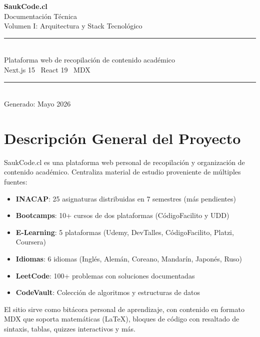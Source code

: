 \documentclass[12pt,a4paper]{article}
\begin{document}
\thispagestyle{empty}
\begin{center}
  \vspace*{3cm}
  {\Huge\bfseries\color{headerblue} SaukCode.cl}\\[0.5cm]
  {\Large\color{accent} Documentación Técnica}\\[0.3cm]
  {\large\color{codegray} Volumen I: Arquitectura y Stack Tecnológico}\\[2cm]
  \rule{10cm}{1.5pt}\\[0.5cm]
  {\normalsize Plataforma web de recopilación de contenido académico}\\[0.3cm]
  {\normalsize Next.js 15 \textbullet\ React 19 \textbullet\ MDX}\\[0.5cm]
  \rule{10cm}{1.5pt}\\[2cm]
  {\small\color{codegray} Generado: Mayo 2026}
\end{center}
\newpage

\tableofcontents
\newpage

\section{Descripción General del Proyecto}

SaukCode.cl es una plataforma web personal de recopilación y organización de contenido académico. Centraliza material de estudio proveniente de múltiples fuentes:

\begin{itemize}[leftmargin=1.5cm]
  \item \textbf{INACAP}: 25 asignaturas distribuidas en 7 semestres (más pendientes)
  \item \textbf{Bootcamps}: 10+ cursos de dos plataformas (CódigoFacilito y UDD)
  \item \textbf{E-Learning}: 5 plataformas (Udemy, DevTalles, CódigoFacilito, Platzi, Coursera)
  \item \textbf{Idiomas}: 6 idiomas (Inglés, Alemán, Coreano, Mandarín, Japonés, Ruso)
  \item \textbf{LeetCode}: 100+ problemas con soluciones documentadas
  \item \textbf{CodeVault}: Colección de algoritmos y estructuras de datos
\end{itemize}

El sitio sirve como bitácora personal de aprendizaje, con contenido en formato MDX que soporta matemáticas (\LaTeX), bloques de código con resaltado de sintaxis, tablas, quizzes interactivos y más.
\end{document}
